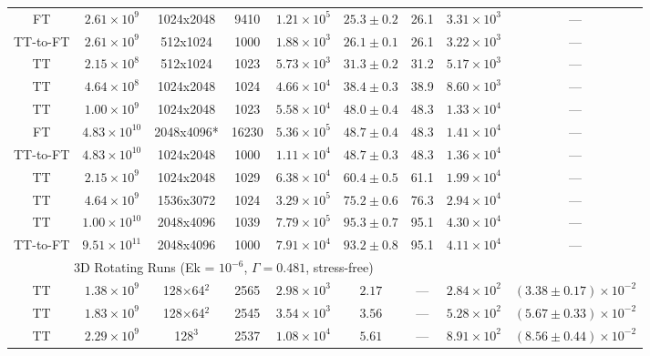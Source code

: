 \documentclass[aps, pre, onecolumn, nofootinbib, notitlepage, groupedaddress, amsfonts, amssymb, amsmath, longbibliography, superscriptaddress]{revtex4-1}
\begin{document}
\begin{table}[ht]
\begin{center}
{\begin{tabular}{c c c c c c c c c}
FT			&	$2.61 \times 10^9$		&	1024x2048	&	9410		&	$1.21 \times 10^5$	&	$25.3 \pm 0.2$	&	26.1	&	$3.31 \times 10^3$ & --- \\
TT-to-FT	&	$2.61 \times 10^9$		&	512x1024	&	1000		&	$1.88 \times 10^3$	&	$26.1 \pm 0.1$	&	26.1	&	$3.22 \times 10^3$ & --- \\
TT			&	$2.15 \times 10^8$		&	512x1024	&	1023		&	$5.73 \times 10^3$	&	$31.3 \pm 0.2$	&	31.2	&	$5.17 \times 10^3$ & --- \\
TT			&	$4.64 \times 10^8$		&	1024x2048	&	1024		&	$4.66 \times 10^4$	&	$38.4 \pm 0.3$	&	38.9	&	$8.60 \times 10^3$ & --- \\
TT			&	$1.00 \times 10^9$		&	1024x2048	&	1023		&	$5.58 \times 10^4$	&	$48.0 \pm 0.4$	&	48.3	&	$1.33 \times 10^4$ & --- \\
FT			&	$4.83 \times 10^{10}$	&	2048x4096*	&	16230		&	$5.36 \times 10^5$	&	$48.7 \pm 0.4$	&	48.3	&	$1.41 \times 10^4$ & --- \\
TT-to-FT	&	$4.83 \times 10^{10}$	&	1024x2048	&	1000		&	$1.11 \times 10^4$	&	$48.7 \pm 0.3$	&	48.3	&	$1.36 \times 10^4$ & --- \\
TT			&	$2.15 \times 10^9$		&	1024x2048	&	1029		&	$6.38 \times 10^4$	&	$60.4 \pm 0.5$	&	61.1	&	$1.99 \times 10^4$ & --- \\
TT			&	$4.64 \times 10^9$		&	1536x3072	&	1024		&	$3.29 \times 10^5$	&	$75.2 \pm 0.6$	&	76.3	&	$2.94 \times 10^4$ & --- \\
TT			&	$1.00 \times 10^{10}$	&	2048x4096	&	1039		&	$7.79 \times 10^5$	&	$95.3 \pm 0.7$	&	95.1	&	$4.30 \times 10^4$ & --- \\
TT-to-FT	&	$9.51 \times 10^{11}$	&	2048x4096	&	1000		&	$7.91 \times 10^4$	& 	$93.2 \pm 0.8$ 	&	95.1	&	$4.11 \times 10^4$ & --- \\
\hline																	
\multicolumn{7}{c}{\vspace{0.1cm}3D Rotating Runs (Ek = $10^{-6}$, $\Gamma = 0.481$, stress-free)} \\
\hline																	
TT	&	$1.38 \times 10^9$		&	128$\times$64$^2$	&	2565		&	$2.98 \times 10^3$	&	$2.17$			&	---		&	$2.84 \times 10^2$  & $(3.38 \pm 0.17) \times 10^{-2}$ \\
TT	&	$1.83 \times 10^9$		&	128$\times$64$^2$	&	2545		&	$3.54 \times 10^3$	&	$3.56$			&	---		&	$5.28 \times 10^2$  & $(5.67 \pm 0.33) \times 10^{-2}$ \\
TT	&	$2.29 \times 10^9$		&	128$^3$				&	2537		&	$1.08 \times 10^4$	&	$5.61$			&	---		&	$8.91 \times 10^2$  & $(8.56 \pm 0.44) \times 10^{-2}$ \\

\end{tabular}}
\end{center}
\end{table}
\end{document}
